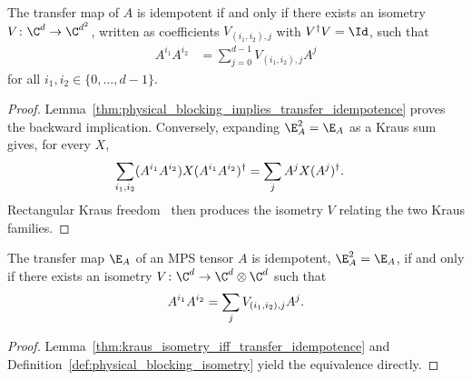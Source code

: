 \begin{lemma}%
    \label{thm:kraus_isometry_iff_transfer_idempotence}
    \leanok
    The transfer map of $A$ is idempotent if and only if there exists an
    isometry $V\colon \C^d\to\C^{d^2}$, written as coefficients
    $V_{(i_1,i_2),j}$ with $V^\dagger V=\Id$, such that
    \begin{align}
        A^{i_1}A^{i_2}
         & =\sum_{j=0}^{d-1}V_{(i_1,i_2),j}A^j
        \label{eq:corr_AA_isometry}
    \end{align}
    for all $i_1,i_2\in\{0,\ldots,d-1\}$.
\end{lemma}
\begin{proof}\leanok
    Lemma~\ref{thm:physical_blocking_implies_transfer_idempotence} proves the
    backward implication. Conversely, expanding $\E_A^2=\E_A$ as a Kraus sum
    gives, for every $X$,
    \begin{align}
        \sum_{i_1,i_2}(A^{i_1}A^{i_2})X(A^{i_1}A^{i_2})^\dagger
         & =\sum_jA^jX(A^j)^\dagger.
        \notag
    \end{align}
    Rectangular Kraus freedom~\cite[``Rectangular Kraus freedom with general finite index types'']{QICLean2026Blueprint} then produces the isometry $V$
    relating the two Kraus families.
\end{proof}

\begin{theorem}
    \label{thm:physical_blocking_isometry_iff_transfer_idempotence}
    \leanok
    The transfer map $\E_A$ of an MPS tensor $A$ is idempotent, $\E_A^2 = \E_A$, if and only if there exists an isometry $V \colon \C^d \to \C^d \otimes \C^d$ such that
    \begin{align}
        A^{i_1} A^{i_2} = \sum_j V_{(i_1, i_2), j} A^j.
        \notag
    \end{align}
\end{theorem}
\begin{proof}\leanok
    Lemma~\ref{thm:kraus_isometry_iff_transfer_idempotence} and
    Definition~\ref{def:physical_blocking_isometry} yield the equivalence
    directly.
\end{proof}

